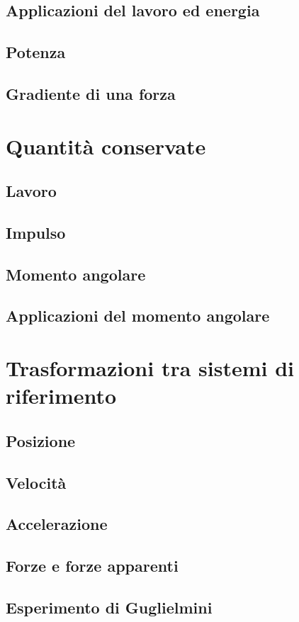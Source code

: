 \documentclass[a4paper]{article}
\begin{document}
\subsection{Applicazioni del lavoro ed energia}
\subsection{Potenza}
\subsection{Gradiente di una forza}

\section{Quantità conservate}
\subsection{Lavoro}
\subsection{Impulso}
\subsection{Momento angolare}
\subsection{Applicazioni del momento angolare}

\section{Trasformazioni tra sistemi di riferimento}
\subsection{Posizione}
\subsection{Velocità}
\subsection{Accelerazione}
\subsection{Forze e forze apparenti}
\subsection{Esperimento di Guglielmini}
\end{document}

